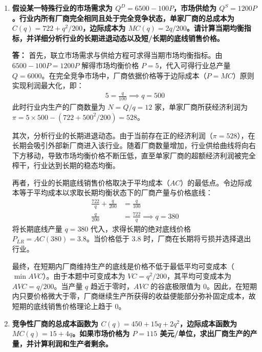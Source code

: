 \begin{enumerate}[label=\textbf{\arabic*.}, leftmargin=*]
		\item \textbf{假设某一特殊行业的市场需求为 $Q^D = 6500 - 100P$，市场供给为 $Q^S = 1200P$。行业内所有厂商完全相同且处于完全竞争状态，单家厂商的总成本为 $C(q) = 722 + q^2/200$，边际成本为 $MC(q) = 2q/200$。请计算当期均衡指标，并详细分析行业的长期进退动态以及短/长期的底线销售价格。}
		
		\textbf{答：}
		首先，联立市场需求与供给方程可求得当期市场均衡指标。由 $6500 - 100P = 1200P$ 解得市场均衡价格 $P = 5$，代入可得行业总产量 $Q = 6000$。在完全竞争市场中，厂商依据价格等于边际成本（$P = MC$）原则实现利润最大化，即：
		\[
		\begin{aligned}
			5 = \frac{q}{100} \implies q = 500
		\end{aligned}
		\]
		此时行业内生产的厂商数量为 $N = Q/q = 12$ 家，单家厂商所获经济利润为 $\pi = 5 \times 500 - (722 + 500^2/200) = 528$。
		
		其次，分析行业的长期进退动态。由于当前存在正的经济利润（$\pi = 528$），在长期会吸引外部新厂商进入该行业。随着厂商数量增加，行业供给曲线将向右下方移动，导致市场均衡价格不断压低，直至单家厂商的超额经济利润被完全榨干，行业达到长期的稳态均衡。
		
		再者，行业的长期底线销售价格取决于平均成本（$AC$）的最低点。令边际成本等于平均成本以求取长期均衡状态下的厂商产量与价格底线：
		\[
		\begin{aligned}
			\frac{722}{q} + \frac{q}{200} &= \frac{q}{100} \\
			\frac{q}{200} &= \frac{722}{q} \implies q = 380
		\end{aligned}
		\]
		将长期底线产量 $q = 380$ 代入，求得长期的绝对底线价格 $P_{LR} = AC(380) = 3.8$。当价格低于 $3.8$ 时，厂商在长期将亏损并选择退出行业。
		
		最终，在短期内厂商维持生产的底线是价格不低于最低平均可变成本（$\min AVC$）。由于本题中可变成本为 $VC = q^2/200$，其平均可变成本为 $AVC = q/200$。当产量 $q$ 趋近于零时，$AVC$ 的谷底极限值为 $0$。因此，在短期内只要价格微大于零，厂商继续生产所获得的收益便能部分弥补固定成本，故短期的底线销售价格理论上趋于 $0$。

		
		\item \textbf{竞争性厂商的总成本函数为 $C(q) = 450 + 15q + 2q^{2}$，边际成本函数为 $MC(q) = 15 + 4q$。如果市场价格为 $P=115$ 美元/单位，求出厂商生产的产量，并计算利润和生产者剩余。}
		

\end{enumerate}

